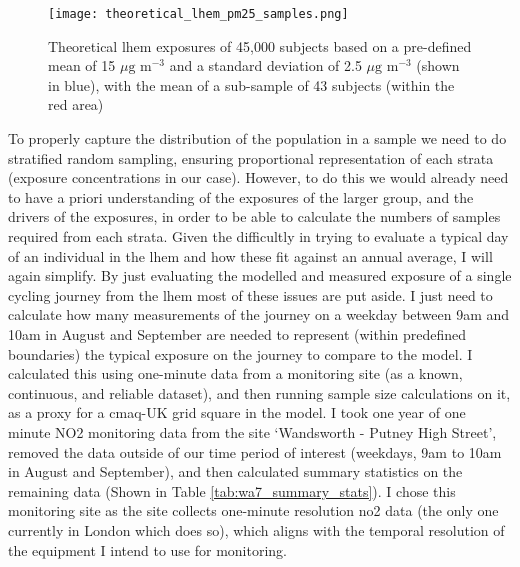 \begin{figure}[H]
\centering
\texttt{[image: theoretical\_lhem\_pm25\_samples.png]}
\caption{Theoretical \gls{lhem} exposures of 45,000 subjects based on a pre-defined mean of 15 $\mu \text{g m}^{-3}$ and a standard deviation of 2.5 $\mu \text{g m}^{-3}$ (shown in blue), with the mean of a sub-sample of 43 subjects (within the red area)}
\label{fig:theoretical_lhem_pm25_samples}
\end{figure}

To properly capture the distribution of the population in a sample we need to do stratified random sampling, ensuring proportional representation of each strata (exposure concentrations in our case).  However, to do this we would already need to have a priori understanding of the exposures of the larger group, and the drivers of the exposures, in order to be able to calculate the numbers of samples required from each strata.
Given the difficultly in trying to evaluate a typical day of an individual in the \gls{lhem} and how these fit against an annual average, I will again simplify. By just evaluating the modelled and measured exposure of a single cycling journey from the \gls{lhem} most of these issues are put aside. I just need to calculate how many measurements of the journey on a weekday between 9am and 10am in August and September are needed to represent (within predefined boundaries) the typical exposure on the journey to compare to the model.
I calculated this using one-minute data from a monitoring site (as a known, continuous, and reliable dataset), and then running sample size calculations on it, as a proxy for a \gls{cmaq}-UK grid square in the model. I took one year of one minute NO2 monitoring data from the site ‘Wandsworth - Putney High Street’, removed the data outside of our time period of interest (weekdays, 9am to 10am in August and September), and then calculated summary statistics on the remaining data (Shown in Table \ref{tab:wa7_summary_stats}). I chose this monitoring site as the site collects one-minute resolution \gls{no2} data (the only one currently in London which does so), which aligns with the temporal resolution of the equipment I intend to use for monitoring.

